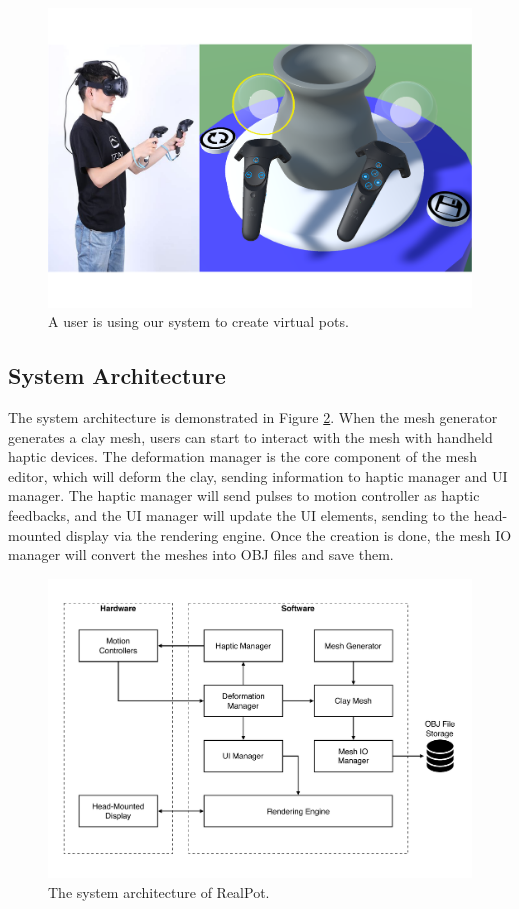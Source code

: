 \documentclass{svjour3}                     %
\begin{document}
\begin{figure}
\includegraphics[width=\textwidth]{fig1}
\caption{A user is using our system to create virtual pots.}
\label{fig:results}
\end{figure}

\subsection{System Architecture}
\label{sec:3.1}

The system architecture is demonstrated in Figure \ref{fig:arc}. When the mesh generator generates a clay mesh, users can start to interact with the mesh with handheld haptic devices. The deformation manager is the core component of the mesh editor, which will deform the clay, sending information to haptic manager and UI manager. The haptic manager will send pulses to motion controller as haptic feedbacks, and the UI manager will update the UI elements, sending to the head-mounted display via the rendering engine. Once the creation is done, the mesh IO manager will convert the meshes into OBJ files and save them.

\begin{figure}
\includegraphics[width=\textwidth]{fig2}
\caption{The system architecture of RealPot.}
\label{fig:arc}
\end{figure}
\end{document}
